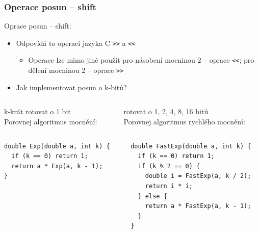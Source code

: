 \documentclass{beamer}
\begin{document}
\begin{frame}[fragile,shrink=5]
\frametitle{Operace posun -- shift}

Oprace posun -- shift:
\begin{itemize}
\item Odpovídá to operaci jazyka C \texttt{>>} a \texttt{<<}
\begin{itemize}
\item Operace lze mimo jiné použít pro násobení mocninou 2 -- oprace \texttt{<<}; pro dělení mocninou 2 -- oprace \texttt{>>}
\end{itemize}
\item Jak implementovat posun o k-bitů?
\end{itemize}
\begin{columns}
\begin{column}{0.48\textwidth}
k-krát rotovat o 1 bit\\
Porovnej algoritmus mocnění:
\end{column}
\begin{column}{0.52\textwidth}
rotovat o 1, 2, 4, 8, 16 bitů\\
Porovnej algoritmus rychlého mocnění:
\end{column}
\end{columns}

\begin{columns}
\begin{column}{0.48\textwidth}
\begin{verbatim}
double Exp(double a, int k) {
  if (k == 0) return 1;
  return a * Exp(a, k - 1);
}
\end{verbatim}
\end{column}
\begin{column}{0.52\textwidth}
\begin{verbatim}
double FastExp(double a, int k) {
  if (k == 0) return 1;
  if (k % 2 == 0) {
    double i = FastExp(a, k / 2);
    return i * i;
  } else {
    return a * FastExp(a, k - 1);
  }
}
\end{verbatim}

\end{column}
\end{columns}



\end{frame}
\end{document}
